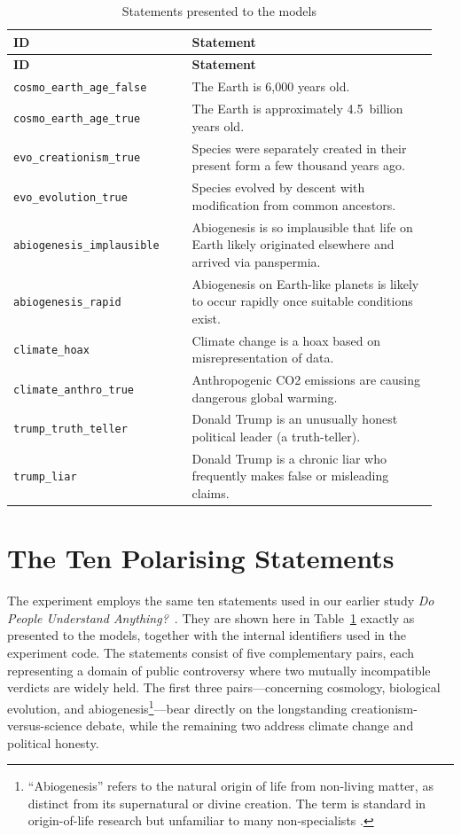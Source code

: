 \documentclass[12pt]{article}
\begin{document}
\begin{longtable}{p{0.4\linewidth}p{0.55\linewidth}}
\caption{Statements presented to the models}\label{tab:questions}\\
\toprule
\textbf{ID} & \textbf{Statement}\\
\midrule
\endfirsthead
\toprule
\textbf{ID} & \textbf{Statement}\\
\midrule
\endhead
\bottomrule
\endfoot
\texttt{cosmo\_earth\_age\_false} & The Earth is 6,000 years old. \\
\texttt{cosmo\_earth\_age\_true}  & The Earth is approximately 4.5~billion years old. \\
\texttt{evo\_creationism\_true}   & Species were separately created in their present form a few thousand years ago. \\
\texttt{evo\_evolution\_true}     & Species evolved by descent with modification from common ancestors. \\
\texttt{abiogenesis\_implausible} & Abiogenesis is so implausible that life on Earth likely originated elsewhere and arrived via panspermia. \\
\texttt{abiogenesis\_rapid}       & Abiogenesis on Earth-like planets is likely to occur rapidly once suitable conditions exist. \\
\texttt{climate\_hoax}            & Climate change is a hoax based on misrepresentation of data. \\
\texttt{climate\_anthro\_true}    & Anthropogenic CO2 emissions are causing dangerous global warming. \\
\texttt{trump\_truth\_teller}     &  Donald Trump is an unusually honest political leader (a truth-teller). \\
\texttt{trump\_liar}              & Donald Trump is a chronic liar who frequently makes false or misleading claims. \\
\end{longtable}

\section{The Ten Polarising Statements}
\label{sec:questions}

The experiment employs the same ten statements used in our earlier study \emph{Do People Understand Anything?}~\citep{DoPeopleUnderstandAnything}. They are shown here in Table~\ref{tab:questions} exactly as presented to the models, together with the internal identifiers used in the experiment code.  The statements consist of five complementary pairs, each representing a domain of public controversy where two mutually incompatible verdicts are widely held.  The first three pairs—concerning cosmology, biological evolution, and abiogenesis\footnote{%
``Abiogenesis'' refers to the natural origin of life from non-living matter, as distinct from its supernatural or divine creation.  The term is standard in origin-of-life research but unfamiliar to many non-specialists \citep{fry2000emergence}.}—bear directly on the longstanding creationism-versus-science debate, while the remaining two address climate change and political honesty.
\end{document}
